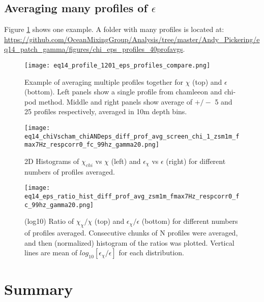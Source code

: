 \documentclass[11pt]{article}
\begin{document}
\clearpage
\subsection{Averaging many profiles of $\epsilon$}

Figure \ref{prof_avg_ex} shows one example. A folder with many profiles is located at:
\url{https://github.com/OceanMixingGroup/Analysis/tree/master/Andy_Pickering/eq14_patch_gamma/figures/chi_eps_profiles_40profavgs}. %

\begin{figure}[htbp]
\texttt{[image: eq14\_profile\_1201\_eps\_profiles\_compare.png]}
\caption{Example of averaging multiple profiles together for $\chi$ (top) and $\epsilon$ (bottom). Left panels show a single profile from chamleeon and chi-pod method. Middle and right panels show average of $+/-$ 5 and 25 profiles respectively, averaged in 10m depth bins.}
\label{prof_avg_ex}
\end{figure}


\begin{figure}[htbp]
\texttt{[image: eq14\_chiVscham\_chiANDeps\_diff\_prof\_avg\_screen\_chi\_1\_zsm1m\_fmax7Hz\_respcorr0\_fc\_99hz\_gamma20.png]}
\caption{2D Histograms of $\chi_{chi}$ vs $\chi$ (left) and $\epsilon_{\chi}$ vs $\epsilon$ (right) for different numbers of profiles averaged.}
\label{}
\end{figure}


\begin{figure}[htbp]
\texttt{[image: eq14\_eps\_ratio\_hist\_diff\_prof\_avg\_zsm1m\_fmax7Hz\_respcorr0\_fc\_99hz\_gamma20.png]}
\caption{(log10) Ratio of $\chi_{\chi}/\chi$ (top) and $\epsilon_{\chi}/\epsilon$ (bottom) for different numbers of profiles averaged. Consecutive chunks of N profiles were averaged, and then (normalized) histogram of the ratios was plotted. Vertical lines are mean of $log_{10}[\epsilon_{\chi}/\epsilon]$ for each distribution. }
\label{}
\end{figure}











\clearpage
\section{Summary}
\end{document}
